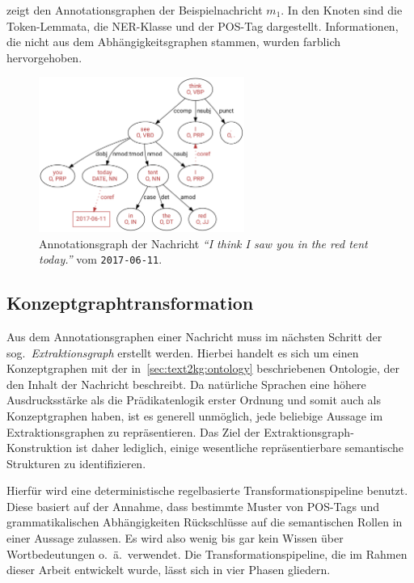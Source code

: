  zeigt den Annotationsgraphen der Beispielnachricht $m_1$.
In den Knoten sind die Token-Lemmata, die NER-Klasse und der POS-Tag dargestellt.
Informationen, die nicht aus dem Abhängigkeitsgraphen stammen, wurden farblich hervorgehoben.
\begin{figure}[h]
	\centering
	\includegraphics[width=0.6\textwidth]{gfx/text2kg/annotationGraph1.pdf}
	\caption{Annotationsgraph der Nachricht \textit{``I think I saw you in the red tent today.''} vom \texttt{2017-06-11}.}\label{fig:text2kg:annotationGraph1} %
\end{figure}

\subsection{Konzeptgraphtransformation}%
\label{sec:text2kg:nlp:transform}

Aus dem Annotationsgraphen einer Nachricht muss im nächsten Schritt der sog.\ \textit{Extraktionsgraph} erstellt werden.
Hierbei handelt es sich um einen Konzeptgraphen mit der in~\ref{sec:text2kg:ontology} beschriebenen Ontologie, der den Inhalt der Nachricht beschreibt.
Da natürliche Sprachen eine höhere Ausdrucksstärke als die Prädikatenlogik erster Ordnung und somit auch als Konzeptgraphen haben, ist es generell unmöglich, jede beliebige Aussage im Extraktionsgraphen zu repräsentieren.
Das Ziel der Extraktionsgraph-Konstruktion ist daher lediglich, einige wesentliche repräsentierbare semantische Strukturen zu identifizieren.

Hierfür wird eine deterministische regelbasierte Transformationspipeline benutzt.
Diese basiert auf der Annahme, dass bestimmte Muster von POS-Tags und grammatikalischen Abhängigkeiten Rückschlüsse auf die semantischen Rollen in einer Aussage zulassen.
Es wird also wenig bis gar kein Wissen über Wortbedeutungen o.~ä.\ verwendet.
Die Transformationspipeline, die im Rahmen dieser Arbeit entwickelt wurde, lässt sich in vier Phasen gliedern.

